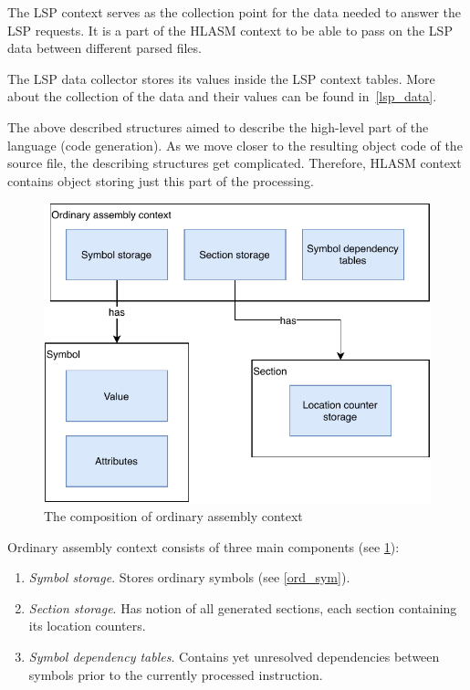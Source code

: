 The LSP context serves as the collection point for the data needed to answer the LSP requests. It is a part of the HLASM context to be able to pass on the LSP data between different parsed files.

The LSP data collector stores its values inside the LSP context tables. More about the collection of the data and their values can be found in~\cref{lsp_data}.

The above described structures aimed to describe the high-level part of the language (code generation). As we move closer to the resulting object code of the source file, the describing structures get complicated. Therefore, HLASM context contains object storing just this part of the processing.

\begin{figure}
	\centering
	\includegraphics[width=\textwidth]{img/ord_ctx_arch}
	\caption{The composition of ordinary assembly context}
	\label{fig06:ord_ctx}
\end{figure}

Ordinary assembly context consists of three main components (see \cref{fig06:ord_ctx}):
\begin{enumerate}
	\item \emph{Symbol storage}. Stores ordinary symbols (see \cref{ord_sym}).
	\item \emph{Section storage}. Has notion of all generated sections, each section containing its location counters.
	\item \emph{Symbol dependency tables}. Contains yet unresolved dependencies between symbols prior to the currently processed instruction.
\end{enumerate}


